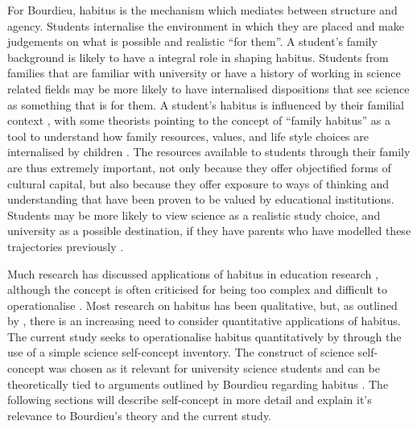 For Bourdieu, habitus is the mechanism which mediates between structure and agency. Students internalise the environment in which they are placed and make judgements on what is possible and realistic ``for them''. A student's family background is likely to have a integral role in shaping habitus. Students from families that are familiar with university or have a history of working in science related fields may be more likely to have internalised dispositions that see science as something that is for them. A student's habitus is influenced by their familial context \cite{Dimaggio1982}, with some theorists pointing to the concept of ``family habitus'' as a tool to understand how family resources, values, and life style choices are internalised by children \cite{Archer2012, tomanovic2004family}. The resources available to students through their family are thus extremely important, not only because they offer objectified forms of cultural capital, but also because they offer exposure to ways of thinking and understanding that have been proven to be valued by educational institutions. Students may be more likely to view science as a realistic study choice, and university as a possible destination, if they have parents who have modelled these trajectories previously \cite{Lyons_2006}. 

Much research has discussed applications of habitus in education research \cite{Reay_2004, Nash1999}, although the concept is often criticised for being too complex \cite{goldhaber2000does} and difficult to operationalise \cite{dumais2002cultural}. Most research on habitus has been qualitative, but, as outlined by \cite{mu2014heritage}, there is an increasing need to consider quantitative applications of habitus. The current study seeks to operationalise habitus quantitatively by through the use of a simple science self-concept inventory. The construct of science self-concept was chosen as it relevant for university science students and can be theoretically tied to arguments outlined by Bourdieu regarding habitus \cite{mu2014heritage, bodovski2014adolescents}. The following sections will describe self-concept in more detail and explain it's relevance to Bourdieu's theory and the current study.   

